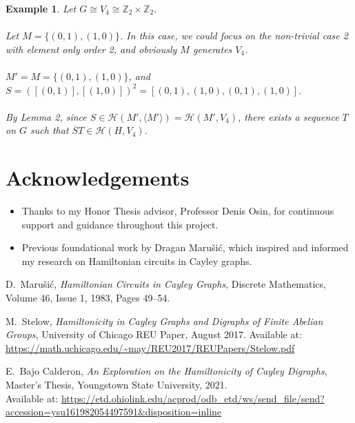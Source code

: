 \documentclass{article}
\newtheorem{example}{Example}
\begin{document}
\begin{example}
    Let $G \cong V_4 \cong \mathbb{Z}_{2} \times \mathbb{Z}_{2}$. 
    \paragraph{}
    Let $M = \{(0, 1), (1, 0)\}$. In this case, we could focus on the non-trivial case 2 with element only order 2, and obviously $M$ generates $V_4$.
    \paragraph{}
    $M' = M = \{(0, 1), (1, 0)\}$, and 
    $S = ([(0, 1)],[(1, 0)])^2=[(0, 1),(1, 0),(0, 1),(1, 0)]$.
    \paragraph{}
    By Lemma 2, since $S\in \mathcal{H}(M', \langle M' \rangle) = 
    \mathcal{H}(M', V_4)$, there exists a sequence $T$ on $G$ such that $\overline{S}T\in\mathcal{H}(H, V_4)$.
\end{example}

\section*{Acknowledgements}
\begin{itemize}
  \item Thanks to my Honor Thesis advisor, Professor Denis Osin, for continuous support and guidance throughout this project.
  \item Previous foundational work by Dragan Maru\v{s}i\'c, which inspired and informed my research on Hamiltonian circuits in Cayley graphs.
\end{itemize}

\begin{thebibliography}{9}

D.~Maru\v{s}i\'c, 
\textit{Hamiltonian Circuits in Cayley Graphs}, 
Discrete Mathematics, Volume 46, Issue 1, 1983, Pages 49–54.

M.~Stelow, 
\textit{Hamiltonicity in Cayley Graphs and Digraphs of Finite Abelian Groups}, 
University of Chicago REU Paper, August 2017. Available at: \url{https://math.uchicago.edu/~may/REU2017/REUPapers/Stelow.pdf}

E.~Bajo Calderon, 
\textit{An Exploration on the Hamiltonicity of Cayley Digraphs}, 
Master’s Thesis, Youngstown State University, 2021.\\
Available at: \url{https://etd.ohiolink.edu/acprod/odb_etd/ws/send_file/send?accession=ysu161982054497591&disposition=inline}
\end{thebibliography}
\end{document}
